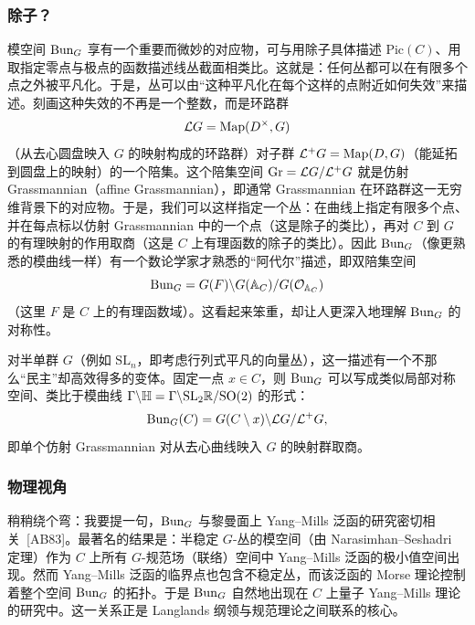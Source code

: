 \subsubsection{除子？}\label{sec:2.2.3}

模空间 $\operatorname{Bun}_{G}$ 享有一个重要而微妙的对应物，可与用除子具体描述 $\mathrm{Pic}(C)$、用取指定零点与极点的函数描述线丛截面相类比。这就是：任何丛都可以在有限多个点之外被平凡化。于是，丛可以由“这种平凡化在每个这样的点附近如何失效”来描述。刻画这种失效的不再是一个整数，而是环路群
\[
\mathcal{L}G=\mathrm{Map}(D^{\times},G)
\]
（从去心圆盘映入 $G$ 的映射构成的环路群）对子群 $\mathcal{L}^{+}G=\mathrm{Map}(D,G)$（能延拓到圆盘上的映射）的一个陪集。这个陪集空间 $\operatorname{Gr}=\mathcal{L}G/\mathcal{L}^{+}G$ 就是仿射 Grassmannian（affine Grassmannian），即通常 Grassmannian 在环路群这一无穷维背景下的对应物。于是，我们可以这样指定一个丛：在曲线上指定有限多个点、并在每点标以仿射 Grassmannian 中的一个点（这是除子的类比），再对 $C$ 到 $G$ 的有理映射的作用取商（这是 $C$ 上有理函数的除子的类比）。因此 $\operatorname{Bun}_{G}$（像更熟悉的模曲线一样）有一个数论学家才熟悉的“阿代尔”描述，即双陪集空间
\[
\operatorname{Bun}_{G}=G(F)\backslash G(\mathbb{A}_{C})/G(\mathcal{O}_{\mathbb{A}_{C}})
\]
（这里 $F$ 是 $C$ 上的有理函数域）。这看起来笨重，却让人更深入地理解 $\operatorname{Bun}_{G}$ 的对称性。

对半单群 $G$（例如 $\mathrm{SL}_{n}$，即考虑行列式平凡的向量丛），这一描述有一个不那么“民主”却高效得多的变体。固定一点 $x\in C$，则 $\operatorname{Bun}_{G}$ 可以写成类似局部对称空间、类比于模曲线 $\Gamma\backslash\mathbb{H}=\Gamma\backslash \mathrm{SL}_{2}\mathbb{R}/\mathrm{SO}(2)$ 的形式：
\[
\operatorname{Bun}_{G}(C)=G(C\setminus x)\backslash \mathcal{L}G/\mathcal{L}^{+}G,
\]
即单个仿射 Grassmannian 对从去心曲线映入 $G$ 的映射群取商。

\subsubsection{物理视角}\label{sec:2.2.4}

稍稍绕个弯：我要提一句，$\operatorname{Bun}_{G}$ 与黎曼面上 Yang–Mills 泛函的研究密切相关~[AB83]。最著名的结果是：半稳定 $G$-丛的模空间（由 Narasimhan–Seshadri 定理）作为 $C$ 上所有 $G$-规范场（联络）空间中 Yang–Mills 泛函的极小值空间出现。然而 Yang–Mills 泛函的临界点也包含不稳定丛，而该泛函的 Morse 理论控制着整个空间 $\operatorname{Bun}_{G}$ 的拓扑。于是 $\operatorname{Bun}_{G}$ 自然地出现在 $C$ 上量子 Yang–Mills 理论的研究中。这一关系正是 Langlands 纲领与规范理论之间联系的核心。

